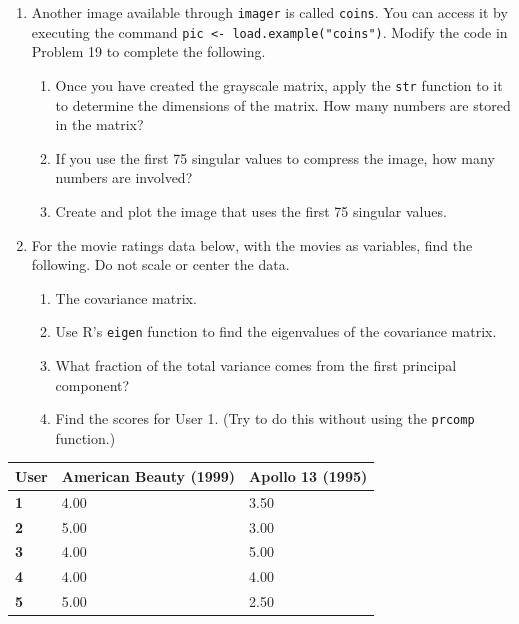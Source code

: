 \documentclass[
]{book}
\providecommand{\tightlist}{%
  \setlength{\itemsep}{0pt}\setlength{\parskip}{0pt}}
\theoremstyle{definition}
\theoremstyle{definition}
\theoremstyle{definition}
\theoremstyle{definition}
\theoremstyle{remark}
\begin{document}
\begin{enumerate}
\def\labelenumi{\arabic{enumi}.}
\setcounter{enumi}{19}
\tightlist
\item
  Another image available through \texttt{imager} is called \texttt{coins}. You can access it by executing the command \texttt{pic\ \textless{}-\ load.example("coins")}. Modify the code in Problem 19 to complete the following.

  \begin{enumerate}
  \def\labelenumii{\alph{enumii}.}
  \tightlist
  \item
    Once you have created the grayscale matrix, apply the \texttt{str} function to it to determine the dimensions of the matrix. How many numbers are stored in the matrix?
  \item
    If you use the first 75 singular values to compress the image, how many numbers are involved?
  \item
    Create and plot the image that uses the first 75 singular values.
  \end{enumerate}
\item
  For the movie ratings data below, with the movies as variables, find the following. Do not scale or center the data.

  \begin{enumerate}
  \def\labelenumii{\alph{enumii}.}
  \tightlist
  \item
    The covariance matrix.
  \item
    Use R's \texttt{eigen} function to find the eigenvalues of the covariance matrix.
  \item
    What fraction of the total variance comes from the first principal component?
  \item
    Find the scores for User 1. (Try to do this without using the \texttt{prcomp} function.)
  \end{enumerate}
\end{enumerate}

\begin{longtable}[]{@{}lll@{}}
\toprule\noalign{}
User & American Beauty (1999) & Apollo 13 (1995) \\
\midrule\noalign{}
\endhead
\bottomrule\noalign{}
\endlastfoot
\textbf{1} & 4.00 & 3.50 \\
\textbf{2} & 5.00 & 3.00 \\
\textbf{3} & 4.00 & 5.00 \\
\textbf{4} & 4.00 & 4.00 \\
\textbf{5} & 5.00 & 2.50 \\
\end{longtable}
\end{document}
